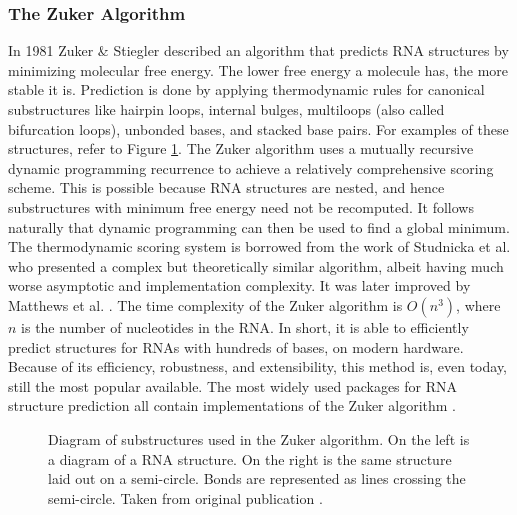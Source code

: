 \documentclass[12pt, a4paper]{article}
\begin{document}
\subsubsection{The Zuker Algorithm}
In 1981 Zuker \& Stiegler \cite{zuker1981optimal}
described an algorithm that predicts RNA structures by minimizing molecular free energy. The lower free energy a molecule has, the more stable it is. Prediction is done
by applying thermodynamic rules for canonical substructures like hairpin loops, internal bulges, multiloops (also called bifurcation loops), unbonded bases, and stacked base pairs. For examples of these structures, refer to Figure \ref{fig:zuk_struct}. The Zuker algorithm uses a mutually recursive dynamic programming recurrence to achieve a relatively comprehensive scoring scheme. This is possible because RNA structures are nested, and hence substructures with minimum free energy need not be recomputed. It follows naturally that dynamic programming can then be used to find a global minimum. The thermodynamic scoring system is borrowed from the work of Studnicka et al. \cite{studnicka1978computer} who presented a
complex but theoretically similar algorithm, albeit having
much worse asymptotic and implementation complexity. It was later improved by Matthews et al. \cite{mathews1999expanded, mathews2004incorporating}. The time complexity of the Zuker algorithm is $O(n^3)$, where $n$ is the number of nucleotides in the RNA. In short, it is able to efficiently predict structures for RNAs with hundreds of bases, on modern hardware.  Because of
its efficiency, robustness, and extensibility, this method is,
even today, still the most popular available. The most widely used packages for RNA structure prediction all contain implementations of the Zuker algorithm \cite{lorenz2011viennarna, reuter2010rnastructure}.

\begin{figure}
\begin{center}
\end{center}
\caption{Diagram of substructures used in the Zuker algorithm. On the left is a diagram of a RNA structure. On the right is the same structure laid out on a semi-circle. Bonds are represented as lines crossing the semi-circle. Taken from original
publication \cite{zuker1981optimal}.}
\label{fig:zuk_struct}
\end{figure}
\end{document}
